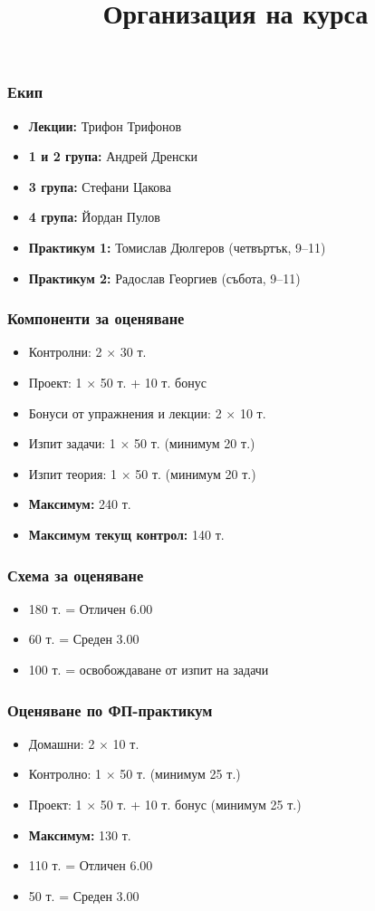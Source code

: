 \documentclass{beamer}
\title{Организация на курса}
\begin{document}
\begin{frame}
  \titlepage
\end{frame}

\begin{frame}
  \frametitle{Екип}

  \begin{itemize}
  \item \textbf{Лекции:} Трифон Трифонов
  \item \textbf{1 и 2 група:} Андрей Дренски
  \item \textbf{3 група:} Стефани Цакова
  \item \textbf{4 група:} Йордан Пулов
  \item \textbf{Практикум 1:} Томислав Дюлгеров (четвъртък, 9--11)
  \item \textbf{Практикум 2:} Радослав Георгиев (събота, 9--11)
  \end{itemize}
\end{frame}

\begin{frame}
  \frametitle{Компоненти за оценяване}

  \begin{itemize}
  \item Контролни: 2 $\times$ 30 т.
  \item Проект: 1 $\times$ 50 т. + 10 т. бонус
  \item Бонуси от упражнения и лекции: 2 $\times$ 10 т.
  \item Изпит задачи: 1 $\times$ 50 т. (минимум 20 т.)
  \item Изпит теория: 1 $\times$ 50 т. (минимум 20 т.)
  \item \textbf{Максимум:} 240 т.
  \item \textbf{Максимум текущ контрол:} 140 т.
  \end{itemize}
\end{frame}

\begin{frame}
  \frametitle{Схема за оценяване}

  \begin{itemize}
  \item 180 т. = Отличен 6.00
  \item 60 т. = Среден 3.00
  \item 100 т. = освобождаване от изпит на задачи
  \end{itemize}
\end{frame}

\begin{frame}
  \frametitle{Оценяване по ФП-практикум}

  \begin{itemize}
  \item Домашни: 2 $\times$ 10 т.
  \item Контролно: 1 $\times$ 50 т. (минимум 25 т.)
  \item Проект: 1 $\times$ 50 т. + 10 т. бонус (минимум 25 т.)
  \item \textbf{Максимум:} 130 т.
  \item 110 т. = Отличен 6.00
  \item 50 т. = Среден 3.00
  \end{itemize}
\end{frame}
\end{document}
